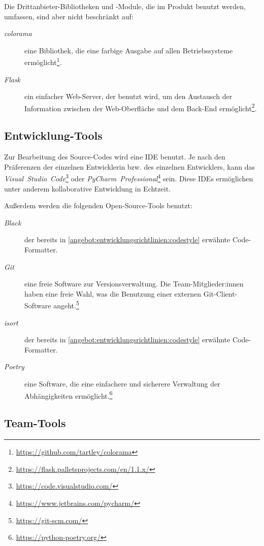 \documentclass{article}
\begin{document}
Die Drittanbieter-Bibliotheken und -Module, die im Produkt benutzt werden, umfassen, sind aber nicht beschränkt auf:

\begin{description}
    \item [\textit{colorama}] eine Bibliothek, die eine farbige Ausgabe auf allen Betriebssysteme ermöglicht\footnote{\url{https://github.com/tartley/colorama}}.
    \item [\textit{Flask}] ein einfacher Web-Server, der benutzt wird, um den Austausch der Information zwischen der Web-Oberfläche und dem Back-End ermöglicht\footnote{\url{https://flask.palletsprojects.com/en/1.1.x/}}.
\end{description}

\subsection{Entwicklung-Tools}

Zur Bearbeitung des Source-Codes wird eine IDE benutzt. Je nach den Präferenzen der einzelnen Entwicklerin bzw. des einzelnen Entwicklers, kann das \textit{Visual~Studio~Code}\footnote{\url{https://code.visualstudio.com/}} oder \textit{PyCharm~Professional}\footnote{\url{https://www.jetbrains.com/pycharm/}} sein. Diese IDEs ermöglichen unter anderem kollaborative Entwicklung in Echtzeit.

Außerdem werden die folgenden Open-Source-Tools benutzt:

\begin{description}
    \item [\textit{Black}] der bereits in \ref{angebot:entwicklungsrichtlinien:codestyle} erwähnte Code-Formatter.
    \item [\textit{Git}] eine freie Software zur Versionsverwaltung. Die Team-Mitglieder:innen haben eine freie Wahl, was die Benutzung einer externen Git-Client-Software angeht.\footnote{\url{https://git-scm.com/}}
    \item [\textit{isort}] der bereits in \ref{angebot:entwicklungsrichtlinien:codestyle} erwähnte Code-Formatter.
    \item [\textit{Poetry}] eine Software, die eine einfachere und sicherere Verwaltung der Abhängigkeiten ermöglicht.\footnote{\url{https://python-poetry.org/}}
\end{description}

\subsection{Team-Tools}
\end{document}
